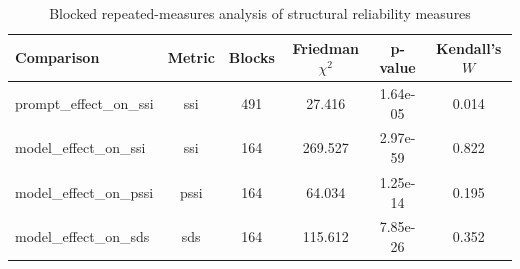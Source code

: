 \begin{table}[t]
\centering
\caption{Blocked repeated-measures analysis of structural reliability measures}
\label{tab:statistical_tests}
\begin{tabular}{lccccc}
\toprule
Comparison & Metric & Blocks & Friedman $\chi^2$ & p-value & Kendall's $W$ \\
\midrule
prompt\_effect\_on\_ssi & ssi & 491 & 27.416 & 1.64e-05 & 0.014 \\
model\_effect\_on\_ssi & ssi & 164 & 269.527 & 2.97e-59 & 0.822 \\
model\_effect\_on\_pssi & pssi & 164 & 64.034 & 1.25e-14 & 0.195 \\
model\_effect\_on\_sds & sds & 164 & 115.612 & 7.85e-26 & 0.352 \\
\bottomrule
\end{tabular}
\end{table}
